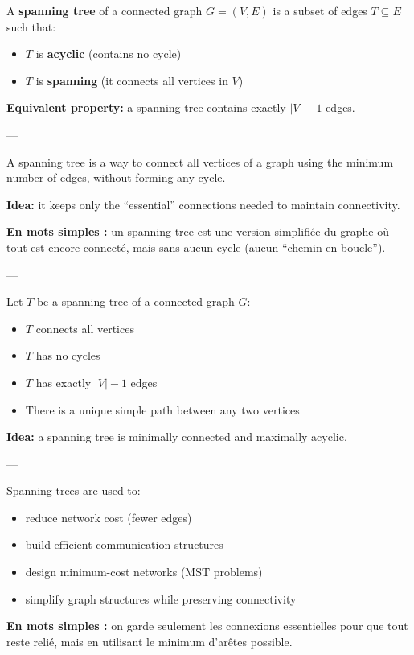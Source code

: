 \documentclass[11pt,a4paper,openany]{book}
\begin{document}
\begin{defnbox}[title=Spanning Tree]
A \textbf{spanning tree} of a connected graph $G=(V,E)$ is a subset of edges $T \subseteq E$ such that:
\begin{itemize}
    \item $T$ is \textbf{acyclic} (contains no cycle)
    \item $T$ is \textbf{spanning} (it connects all vertices in $V$)
\end{itemize}

\textbf{Equivalent property:} a spanning tree contains exactly $|V|-1$ edges.
\end{defnbox}

---

\begin{defnbox}[title=Spanning Tree (Intuition)]
A spanning tree is a way to connect all vertices of a graph using the minimum number of edges, without forming any cycle.

\textbf{Idea:} it keeps only the “essential” connections needed to maintain connectivity.

\textbf{En mots simples :} un spanning tree est une version simplifiée du graphe où tout est encore connecté, mais sans aucun cycle (aucun “chemin en boucle”).
\end{defnbox}

---

\begin{defnbox}[title=Properties of a Spanning Tree]
Let $T$ be a spanning tree of a connected graph $G$:
\begin{itemize}
    \item $T$ connects all vertices
    \item $T$ has no cycles
    \item $T$ has exactly $|V|-1$ edges
    \item There is a unique simple path between any two vertices
\end{itemize}

\textbf{Idea:} a spanning tree is minimally connected and maximally acyclic.
\end{defnbox}

---

\begin{defnbox}[title=Why Spanning Trees are Important]
Spanning trees are used to:
\begin{itemize}
    \item reduce network cost (fewer edges)
    \item build efficient communication structures
    \item design minimum-cost networks (MST problems)
    \item simplify graph structures while preserving connectivity
\end{itemize}

\textbf{En mots simples :} on garde seulement les connexions essentielles pour que tout reste relié, mais en utilisant le minimum d’arêtes possible.
\end{defnbox}
\end{document}
